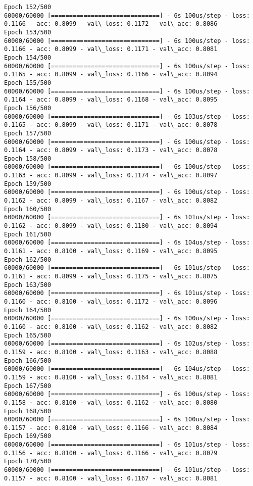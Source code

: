 \documentclass[11pt]{article}
\begin{document}
\begin{Verbatim}[commandchars=\\\{\}]
Epoch 152/500
60000/60000 [==============================] - 6s 100us/step - loss: 0.1166 - acc: 0.8099 - val\_loss: 0.1172 - val\_acc: 0.8086
Epoch 153/500
60000/60000 [==============================] - 6s 100us/step - loss: 0.1166 - acc: 0.8099 - val\_loss: 0.1171 - val\_acc: 0.8081
Epoch 154/500
60000/60000 [==============================] - 6s 100us/step - loss: 0.1165 - acc: 0.8099 - val\_loss: 0.1166 - val\_acc: 0.8094
Epoch 155/500
60000/60000 [==============================] - 6s 100us/step - loss: 0.1164 - acc: 0.8099 - val\_loss: 0.1168 - val\_acc: 0.8095
Epoch 156/500
60000/60000 [==============================] - 6s 103us/step - loss: 0.1165 - acc: 0.8099 - val\_loss: 0.1171 - val\_acc: 0.8078
Epoch 157/500
60000/60000 [==============================] - 6s 100us/step - loss: 0.1164 - acc: 0.8099 - val\_loss: 0.1173 - val\_acc: 0.8078
Epoch 158/500
60000/60000 [==============================] - 6s 100us/step - loss: 0.1163 - acc: 0.8099 - val\_loss: 0.1174 - val\_acc: 0.8097
Epoch 159/500
60000/60000 [==============================] - 6s 100us/step - loss: 0.1162 - acc: 0.8099 - val\_loss: 0.1167 - val\_acc: 0.8082
Epoch 160/500
60000/60000 [==============================] - 6s 101us/step - loss: 0.1162 - acc: 0.8099 - val\_loss: 0.1180 - val\_acc: 0.8094
Epoch 161/500
60000/60000 [==============================] - 6s 104us/step - loss: 0.1161 - acc: 0.8100 - val\_loss: 0.1169 - val\_acc: 0.8095
Epoch 162/500
60000/60000 [==============================] - 6s 101us/step - loss: 0.1161 - acc: 0.8099 - val\_loss: 0.1175 - val\_acc: 0.8075
Epoch 163/500
60000/60000 [==============================] - 6s 101us/step - loss: 0.1160 - acc: 0.8100 - val\_loss: 0.1172 - val\_acc: 0.8096
Epoch 164/500
60000/60000 [==============================] - 6s 100us/step - loss: 0.1160 - acc: 0.8100 - val\_loss: 0.1162 - val\_acc: 0.8082
Epoch 165/500
60000/60000 [==============================] - 6s 102us/step - loss: 0.1159 - acc: 0.8100 - val\_loss: 0.1163 - val\_acc: 0.8088
Epoch 166/500
60000/60000 [==============================] - 6s 104us/step - loss: 0.1159 - acc: 0.8100 - val\_loss: 0.1164 - val\_acc: 0.8081
Epoch 167/500
60000/60000 [==============================] - 6s 100us/step - loss: 0.1158 - acc: 0.8100 - val\_loss: 0.1162 - val\_acc: 0.8080
Epoch 168/500
60000/60000 [==============================] - 6s 100us/step - loss: 0.1157 - acc: 0.8100 - val\_loss: 0.1166 - val\_acc: 0.8084
Epoch 169/500
60000/60000 [==============================] - 6s 101us/step - loss: 0.1156 - acc: 0.8100 - val\_loss: 0.1166 - val\_acc: 0.8079
Epoch 170/500
60000/60000 [==============================] - 6s 101us/step - loss: 0.1157 - acc: 0.8100 - val\_loss: 0.1167 - val\_acc: 0.8081

\end{Verbatim}
\end{document}
